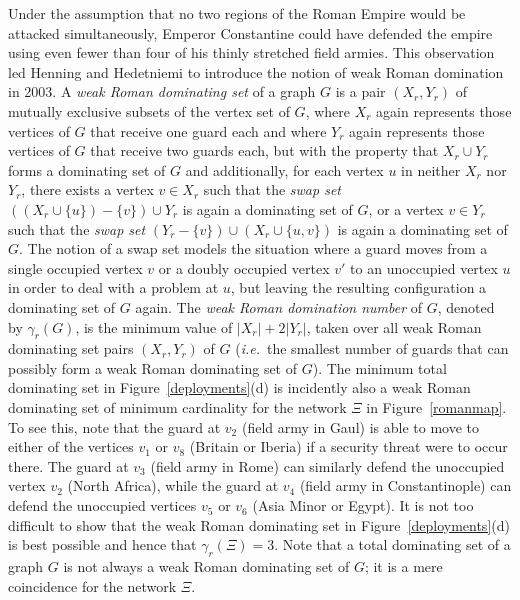 \documentclass[10pt,a4paper]{article}
\begin{document}
Under the assumption that no two regions of the Roman Empire would be attacked simultaneously, Emperor Constantine could have defended the empire using even fewer than four of his thinly stretched field armies.  This observation led Henning and Hedetniemi \cite{henning} to introduce the notion of {weak Roman domination} in 2003.  A {\em weak Roman dominating set} of a graph $G$ is a pair $(X_r,Y_r)$ of mutually exclusive subsets of the vertex set of $G$, where $X_r$ again represents those vertices of $G$ that receive one guard each and where $Y_r$ again represents those vertices of $G$ that receive two guards each, but with the property that $X_r\cup Y_r$ forms a dominating set of $G$ and additionally, for each vertex $u$ in neither $X_r$ nor $Y_r$, there exists a vertex $v\in X_r$ such that the {\em swap set} $((X_r\cup\{u\})-\{v\})\cup Y_r$ is again a dominating set of $G$, or a vertex $v\in Y_r$ such that the {\em swap set} $(Y_r-\{v\})\cup (X_r\cup \{u,v\})$ is again a dominating set of $G$. The notion 
of a swap set models the situation where a guard moves from a single occupied vertex $v$ or a doubly occupied vertex $v'$ to an unoccupied vertex $u$ in order to deal with a problem at $u$, but leaving the resulting configuration a dominating set of $G$ again.  The {\em weak Roman domination number} of $G$, denoted by $\gamma_r(G)$, is the minimum value of $|X_r|+2|Y_r|$, taken over all weak Roman dominating set pairs $(X_r,Y_r)$ of $G$ ({\em i.e.}\ the smallest number of guards that can possibly form a weak Roman dominating set of $G$).  The minimum total dominating set in Figure~\ref{deployments}(d) is incidently also a weak Roman dominating set of minimum cardinality for the network $\Xi$ in Figure~\ref{romanmap}. To see this, note that the guard at $v_2$ (field army in Gaul) is able to move to either of the vertices $v_1$ or $v_8$ (Britain or Iberia) if a security threat were to occur there. The guard at $v_3$ (field army in Rome) can similarly defend the unoccupied vertex $v_2$ (North Africa), while the 
guard at $v_4$ (field army in Constantinople) can defend the unoccupied vertices $v_5$ or $v_6$ (Asia Minor or Egypt). It is not too difficult to show that the weak Roman dominating set in Figure~\ref{deployments}(d) is best possible and hence that $\gamma_r(\Xi) =3$. Note that a total dominating set of a graph $G$ is not always a weak Roman dominating set of $G$; it is a mere coincidence for the network $\Xi$.
\end{document}
